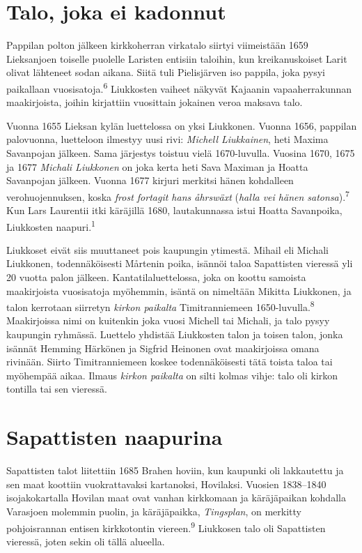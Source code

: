 \documentclass[11pt,a4paper]{article}
\newcommand{\vn}[1]{\textsuperscript{\color{leima}#1}}
\begin{document}
\section{Talo, joka ei kadonnut}

Pappilan polton jälkeen kirkkoherran virkatalo siirtyi viimeistään 1659 Lieksanjoen toiselle puolelle Laristen entisiin taloihin, kun kreikanuskoiset Larit olivat lähteneet sodan aikana. Siitä tuli Pielisjärven iso pappila, joka pysyi paikallaan vuosisatoja.\vn{6} Liukkosten vaiheet näkyvät Kajaanin vapaaherrakunnan maakirjoista, joihin kirjattiin vuosittain jokainen veroa maksava talo.

Vuonna 1655 Lieksan kylän luettelossa on yksi Liukkonen. Vuonna 1656, pappilan palovuonna, luetteloon ilmestyy uusi rivi: \emph{Michell Liukkainen}, heti Maxima Savanpojan jälkeen. Sama järjestys toistuu vielä 1670-luvulla. Vuosina 1670, 1675 ja 1677 \emph{Michali Liukkonen} on joka kerta heti Sava Maximan ja Hoatta Savanpojan jälkeen. Vuonna 1677 kirjuri merkitsi hänen kohdalleen verohuojennuksen, koska \emph{frost fortagit hans åhrswäxt} (\emph{halla vei hänen satonsa}).\vn{7} Kun Lars Laurentii itki käräjillä 1680, lautakunnassa istui Hoatta Savanpoika, Liukkosten naapuri.\vn{1}

Liukkoset eivät siis muuttaneet pois kaupungin ytimestä. Mihail eli Michali Liukkonen, todennäköisesti Mårtenin poika, isännöi taloa Sapattisten vieressä yli 20 vuotta palon jälkeen. Kantatilaluettelossa, joka on koottu samoista maakirjoista vuosisatoja myöhemmin, isäntä on nimeltään Mikitta Liukkonen, ja talon kerrotaan siirretyn \emph{kirkon paikalta} Timitranniemeen 1650-luvulla.\vn{8} Maakirjoissa nimi on kuitenkin joka vuosi Michell tai Michali, ja talo pysyy kaupungin ryhmässä. Luettelo yhdistää Liukkosten talon ja toisen talon, jonka isännät Hemming Härkönen ja Sigfrid Heinonen ovat maakirjoissa omana rivinään. Siirto Timitranniemeen koskee todennäköisesti tätä toista taloa tai myöhempää aikaa. Ilmaus \emph{kirkon paikalta} on silti kolmas vihje: talo oli kirkon tontilla tai sen vieressä.

\section{Sapattisten naapurina}

Sapattisten talot liitettiin 1685 Brahen hoviin, kun kaupunki oli lakkautettu ja sen maat koottiin vuokrattavaksi kartanoksi, Hovilaksi. Vuosien 1838–1840 isojakokartalla Hovilan maat ovat vanhan kirkkomaan ja käräjäpaikan kohdalla Varasjoen molemmin puolin, ja käräjäpaikka, \emph{Tingsplan}, on merkitty pohjoisrannan entisen kirkkotontin viereen.\vn{9} Liukkosen talo oli Sapattisten vieressä, joten sekin oli tällä alueella.
\end{document}
